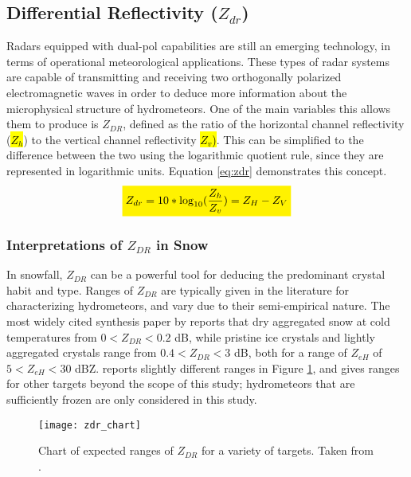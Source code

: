 \subsection{Differential Reflectivity ($Z_{dr}$)}
Radars equipped with dual-pol capabilities are still an emerging technology, in terms of operational meteorological applications. These
types of radar systems are capable of transmitting and receiving two orthogonally polarized electromagnetic waves in order to deduce more information about
the microphysical structure of hydrometeors. One of the main variables this allows them to produce is $Z_{DR}$, defined as the ratio of the horizontal
channel reflectivity (\hl{$Z_h$}) to the vertical channel reflectivity \hl{$Z_{v}$)}. This can be simplified to the difference between the two using the
logarithmic
quotient rule, since they are represented in logarithmic units. Equation \ref{eq:zdr} demonstrates this concept.
\begin{equation}\label{eq:zdr}
\mathcolorbox{yellow}{Z_{dr} = 10 * \log_{10}(\frac{Z_h}{Z_v}) = Z_H - Z_V}
\end{equation}
\subsubsection{Interpretations of $Z_{DR}$ in Snow}
In snowfall, $Z_{DR}$ can be a powerful tool for deducing the predominant crystal habit and type. Ranges of $Z_{DR}$ are typically given in the literature for characterizing hydrometeors, and vary due to their semi-empirical nature. The most widely cited synthesis paper by \citet{Straka2000} reports that dry aggregated snow at cold temperatures from $0 < Z_{DR} < 0.2$ dB, while pristine ice crystals and lightly aggregated crystals range from $0.4 < Z_{DR} < 3$ dB, both for a range of $Z_{eH}$ of $5 < Z_{eH} < 30$ dBZ. \citet{Fabry2015} reports slightly different ranges in Figure \ref{zdr_chart}, and gives ranges for other targets beyond the scope of this study; hydrometeors that are sufficiently frozen are only considered in this study.
\begin{figure}[H]
\texttt{[image: zdr\_chart]}
\caption{Chart of expected ranges of $Z_{DR}$ for a variety of targets. Taken from \citet{Fabry2015}.} 
\label{zdr_chart}
\end{figure}
